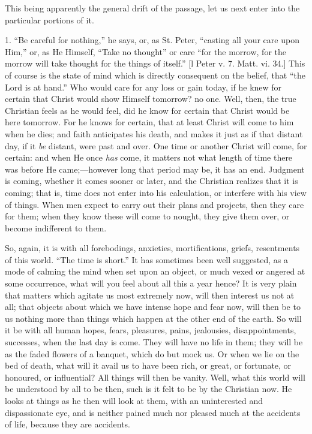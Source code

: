 This being apparently the general drift of the passage, let us next
enter into the particular portions of it.

1. ``Be careful for nothing,'' he says, or, as St. Peter,
``casting all your care upon Him,'' or, as He Himself,
``Take no thought'' or care ``for the morrow, for the
morrow will take thought for the things of itself.'' [l Peter v.
7. Matt. vi. 34.] This of course is the state of mind which is
directly consequent on the belief, that ``the Lord is at
hand.'' Who would care for any loss or gain today, if he knew for
certain that Christ would show Himself tomorrow? no one. Well, then,
the true Christian feels as he would feel, did he know for certain
that Christ would be here tomorrow. For he knows for certain, that at
least Christ will come to him when he dies; and faith anticipates his
death, and makes it just as if that distant day, if it \emph{be}
distant, were past and over. One time or another Christ will come, for
certain: and when He once \emph{has} come, it matters not what length
of time there was before He came;—however long that period may be,
it has an end. Judgment is coming, whether it comes sooner or later,
and the Christian realizes that it is coming; that is, time does not
enter into his calculation, or interfere with his view of things. When
men expect to carry out their plans and projects, then they care for
them; when they know these will come to nought, they give them over,
or become indifferent to them.

So, again, it is with all forebodings, anxieties, mortifications,
griefs, resentments of this world. ``The time is short.'' It
has sometimes been well suggested, as a mode of calming the mind when
set upon an object, or much vexed or angered at some occurrence, what
will you feel about all this a year hence? It is very plain that
matters which agitate us most extremely now, will then interest us not
at all; that objects about which we have intense hope and fear now,
will then be to us nothing more than things which happen at the other
end of the earth. So will it be with all human hopes, fears,
pleasures, pains, jealousies, disappointments, successes, when the
last day is come. They will have no life in them; they will be as the
faded flowers of a banquet, which do but mock us. Or when we lie on
the bed of death, what will it avail us to have been rich, or great,
or fortunate, or honoured, or influential? All things will then be
vanity. Well, what this world will be understood by all to be then,
such is it felt to be by the Christian now. He looks at things as he
then will look at them, with an uninterested and dispassionate eye,
and is neither pained much nor pleased much at the accidents of life,
because they are accidents.


